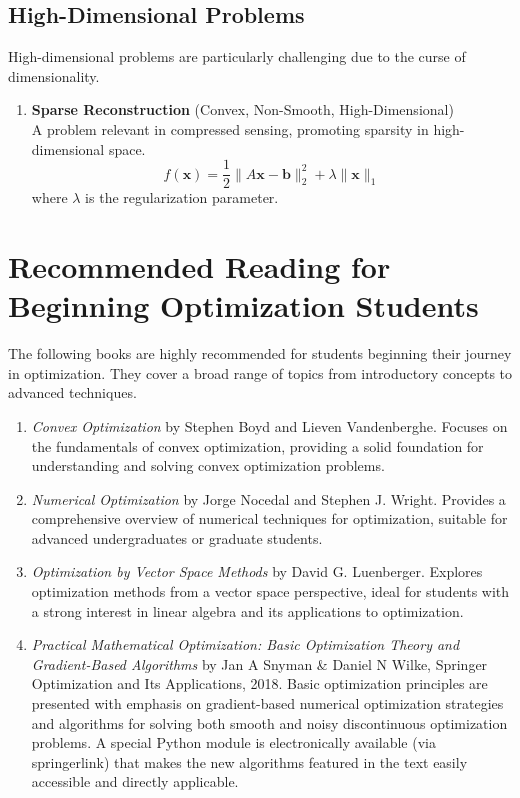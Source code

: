 \documentclass{article}
\begin{document}
\subsection{High-Dimensional Problems}

High-dimensional problems are particularly challenging due to the curse of dimensionality.

\begin{enumerate}
    \item \textbf{Sparse Reconstruction} (Convex, Non-Smooth, High-Dimensional) \\
    A problem relevant in compressed sensing, promoting sparsity in high-dimensional space.
    \[ f(\mathbf{x}) = \frac{1}{2} \|A\mathbf{x} - \mathbf{b}\|^2_2 + \lambda \|\mathbf{x}\|_1 \]
    where $\lambda$ is the regularization parameter.
\end{enumerate}

\section{Recommended Reading for Beginning Optimization Students}

The following books are highly recommended for students beginning their journey in optimization. They cover a broad range of topics from introductory concepts to advanced techniques.

\begin{enumerate}

    \item \textit{Convex Optimization} by Stephen Boyd and Lieven Vandenberghe. Focuses on the fundamentals of convex optimization, providing a solid foundation for understanding and solving convex optimization problems.
    
    \item \textit{Numerical Optimization} by Jorge Nocedal and Stephen J. Wright. Provides a comprehensive overview of numerical techniques for optimization, suitable for advanced undergraduates or graduate students.
    
    \item \textit{Optimization by Vector Space Methods} by David G. Luenberger. Explores optimization methods from a vector space perspective, ideal for students with a strong interest in linear algebra and its applications to optimization.

    \item \textit{Practical Mathematical Optimization: Basic Optimization Theory and Gradient-Based Algorithms} by Jan A Snyman \& Daniel N Wilke, Springer Optimization and Its Applications, 2018. Basic optimization principles are presented with emphasis on gradient-based numerical optimization strategies and algorithms for solving both smooth and noisy discontinuous optimization problems. A special Python module is electronically available (via springerlink) that makes the new algorithms featured in the text easily accessible and directly applicable.
\end{enumerate}
\end{document}
